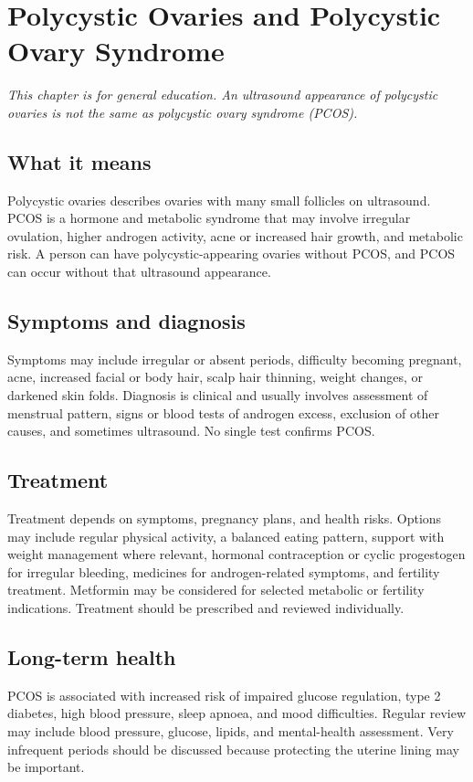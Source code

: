 \chapter{Polycystic Ovaries and Polycystic Ovary Syndrome}

\medskip
\noindent\textit{This chapter is for general education. An ultrasound appearance of polycystic ovaries is not the same as polycystic ovary syndrome (PCOS).}

\section*{What it means}
Polycystic ovaries describes ovaries with many small follicles on ultrasound. PCOS is a hormone and metabolic syndrome that may involve irregular ovulation, higher androgen activity, acne or increased hair growth, and metabolic risk. A person can have polycystic-appearing ovaries without PCOS, and PCOS can occur without that ultrasound appearance.

\section*{Symptoms and diagnosis}
Symptoms may include irregular or absent periods, difficulty becoming pregnant, acne, increased facial or body hair, scalp hair thinning, weight changes, or darkened skin folds. Diagnosis is clinical and usually involves assessment of menstrual pattern, signs or blood tests of androgen excess, exclusion of other causes, and sometimes ultrasound. No single test confirms PCOS.

\section*{Treatment}
Treatment depends on symptoms, pregnancy plans, and health risks. Options may include regular physical activity, a balanced eating pattern, support with weight management where relevant, hormonal contraception or cyclic progestogen for irregular bleeding, medicines for androgen-related symptoms, and fertility treatment. Metformin may be considered for selected metabolic or fertility indications. Treatment should be prescribed and reviewed individually.

\section*{Long-term health}
PCOS is associated with increased risk of impaired glucose regulation, type 2 diabetes, high blood pressure, sleep apnoea, and mood difficulties. Regular review may include blood pressure, glucose, lipids, and mental-health assessment. Very infrequent periods should be discussed because protecting the uterine lining may be important.

